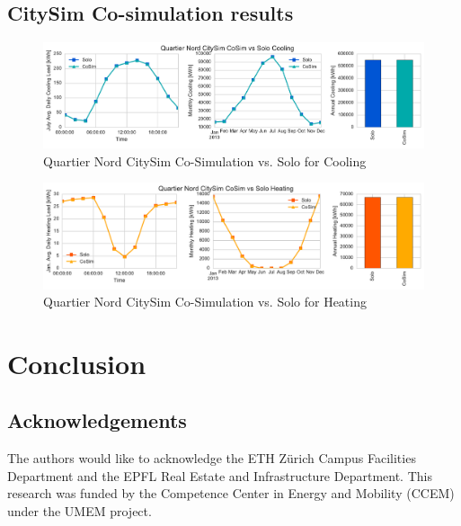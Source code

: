 \documentclass{tBPS2e}
\theoremstyle{plain}
\theoremstyle{definition}
\theoremstyle{remark}
\begin{document}
\subsection{CitySim Co-simulation results}

\begin{figure}[H]
\centering
\includegraphics[scale=0.55]{figures/QN_CitySim_Cooling}
\caption{Quartier Nord CitySim Co-Simulation vs. Solo for Cooling}
\label{fig:qn_citysim_cosimvssolo_cooling}
\end{figure}

\begin{figure}[H]
\centering
\includegraphics[scale=0.55]{figures/QN_CitySim_Heating}
\caption{Quartier Nord CitySim Co-Simulation vs. Solo for Heating}
\label{fig:qn_citysim_cosimvssolo_heating}
\end{figure}


\section{Conclusion}

\subsection{Acknowledgements}

The authors would like to acknowledge the ETH Z\"urich Campus Facilities Department and the EPFL Real Estate and Infrastructure Department. This research was funded by the Competence Center in Energy and Mobility (CCEM) under the UMEM project.



\end{document}

